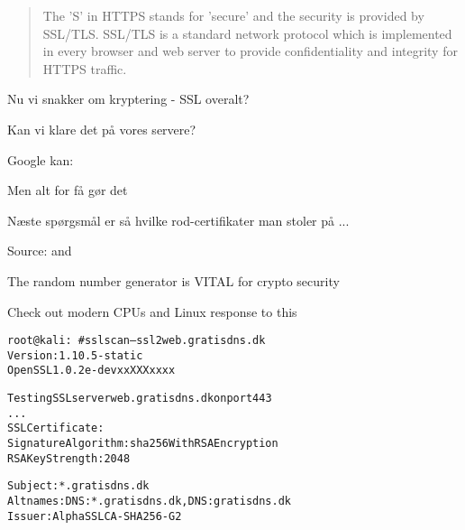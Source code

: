 \documentclass[Screen16to9,17pt]{foils}
\begin{document}

\begin{quote}
The 'S' in HTTPS stands for 'secure' and the security is provided by SSL/TLS. SSL/TLS is a standard network protocol which is implemented in every browser and web server to provide confidentiality and integrity for HTTPS traffic.
\end{quote}

\begin{list1}
\item Nu vi snakker om kryptering - SSL overalt?
\item Kan vi klare det på vores servere?
\pause
\item Google kan:\\
\item Men alt for få gør det
\end{list1}
\pause
\centerline{Næste spørgsmål er så hvilke rod-certifikater man stoler på ...}





Source:  and \\



{\small{}}

\centerline{The random number generator is VITAL for crypto security}

Check out modern CPUs and Linux response to this\\




\begin{alltt}\small
root@kali:~# sslscan --ssl2 web.gratisdns.dk
Version: 1.10.5-static
OpenSSL 1.0.2e-dev xx XXX xxxx

Testing SSL server web.gratisdns.dk on port 443
...
  SSL Certificate:
Signature Algorithm: sha256WithRSAEncryption
RSA Key Strength:    2048

Subject:  *.gratisdns.dk
Altnames: DNS:*.gratisdns.dk, DNS:gratisdns.dk
Issuer:   AlphaSSL CA - SHA256 - G2
\end{alltt}
\end{document}

